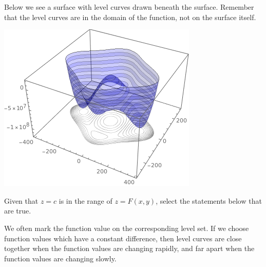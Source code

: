 \documentclass{ximera}
\begin{document}
 Below we see a surface with level curves drawn
beneath the surface.  Remember that the level curves are in the 
domain of the function, not on the surface itself.

\begin{image}
  \includegraphics{firstContourPlot.png}
\end{image}


\begin{example}
  Given that $z=c$ is in the range of $z=F(x,y)$, select the
  statements below that are true.
  \begin{selectAll}
  \end{selectAll}
\end{example}


We often mark the function value on the corresponding level set. 
If we choose function values which have a constant difference, then level
curves are close together when the function values are changing rapidly, and
far apart when the function values are changing slowly.
\end{document}
